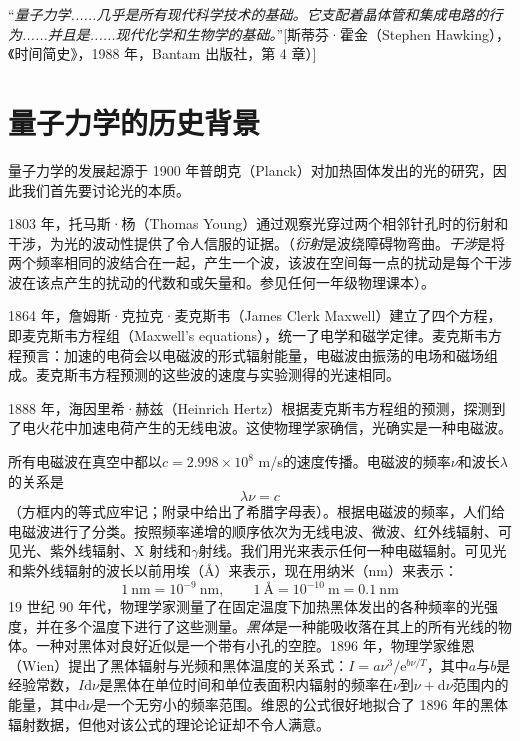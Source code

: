	“\textit{量子力学......几乎是所有现代科学技术的基础。它支配着晶体管和集成电路的行为......并且是......现代化学和生物学的基础。}”[斯蒂芬·霍金（Stephen Hawking），《时间简史》，1988 年，Bantam 出版社，第 4 章）]
	
	\section{量子力学的历史背景}
	\label{sec:1.2 Historical Background of Quantum Mechanics}
	\noindent 量子力学的发展起源于 1900 年普朗克（Planck）对加热固体发出的光的研究，因此我们首先要讨论光的本质。

	1803 年，托马斯·杨（Thomas Young）通过观察光穿过两个相邻针孔时的衍射和干涉，为光的波动性提供了令人信服的证据。（\textit{衍射}是波绕障碍物弯曲。\textit{干涉}是将两个频率相同的波结合在一起，产生一个波，该波在空间每一点的扰动是每个干涉波在该点产生的扰动的代数和或矢量和。参见任何一年级物理课本）。

	1864 年，詹姆斯·克拉克·麦克斯韦（James Clerk Maxwell）建立了四个方程，即麦克斯韦方程组（Maxwell's equations），统一了电学和磁学定律。麦克斯韦方程预言：加速的电荷会以电磁波的形式辐射能量，电磁波由振荡的电场和磁场组成。麦克斯韦方程预测的这些波的速度与实验测得的光速相同。

	1888 年，海因里希·赫兹（Heinrich Hertz）根据麦克斯韦方程组的预测，探测到了电火花中加速电荷产生的无线电波。这使物理学家确信，光确实是一种电磁波。

	所有电磁波在真空中都以$c = 2.998 \times 10^8$ m/s的速度传播。电磁波的频率$\nu$和波长$\lambda$的关系是
	\begin{equation}
		\boxed{\lambda \nu = c}
		\label{eq:1.1 wavelength and frequency}
	\end{equation}
	（方框内的等式应牢记；附录中给出了希腊字母表）。根据电磁波的频率，人们给电磁波进行了分类。按照频率递增的顺序依次为无线电波、微波、红外线辐射、可见光、紫外线辐射、X 射线和$\gamma$射线。我们用光来表示任何一种电磁辐射。可见光和紫外线辐射的波长以前用埃（\AA）来表示，现在用纳米（nm）来表示：
	\begin{equation}
		\boxed{1 \: \text{nm} = 10^{-9} \: \text{nm}, \qquad 1 \: \text{\AA}= 10^{-10} \: \text{m} = 0.1 \: \text{nm}}
		\label{units:1.2 nm and angstroms}
	\end{equation}
	19 世纪 90 年代，物理学家测量了在固定温度下加热黑体发出的各种频率的光强度，并在多个温度下进行了这些测量。\textit{黑体}是一种能吸收落在其上的所有光线的物体。一种对黑体对良好近似是一个带有小孔的空腔。1896 年，物理学家维恩（Wien）提出了黑体辐射与光频和黑体温度的关系式：$I=a\nu^3/\text{e}^{b\nu /T}$，其中$a$与$b$是经验常数，$I \text{d} \nu$是黑体在单位时间和单位表面积内辐射的频率在$\nu$到$\nu + \text{d} \nu$范围内的能量，其中$\text{d} \nu$是一个无穷小的频率范围。维恩的公式很好地拟合了 1896 年的黑体辐射数据，但他对该公式的理论论证却不令人满意。

